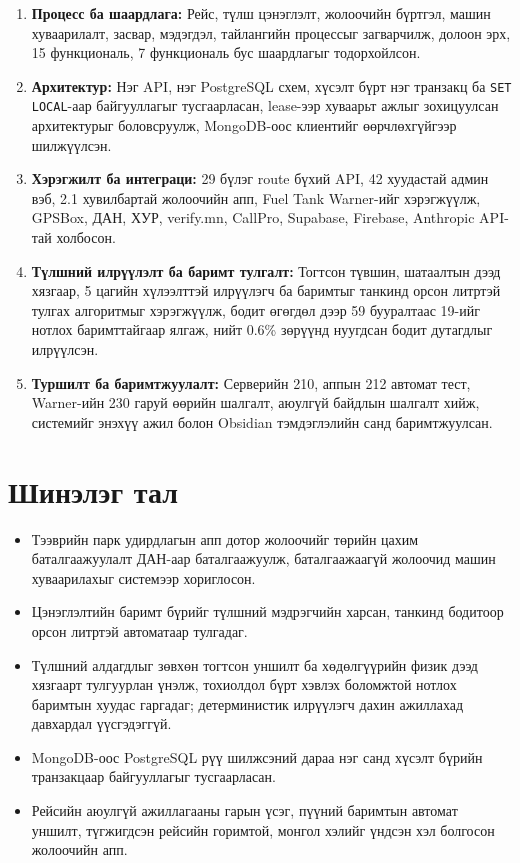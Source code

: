\documentclass[
12pt,
oneside,
english,
onehalfspacing,
nolistspacing,
headsepline,
]{MUST-Thesis}
\begin{document}
\begin{enumerate}
    \item \textbf{Процесс ба шаардлага:} Рейс, түлш цэнэглэлт, жолоочийн бүртгэл, машин хуваарилалт, засвар, мэдэгдэл, тайлангийн процессыг загварчилж, долоон эрх, 15 функциональ, 7 функциональ бус шаардлагыг тодорхойлсон.
    \item \textbf{Архитектур:} Нэг API, нэг PostgreSQL схем, хүсэлт бүрт нэг транзакц ба \texttt{SET LOCAL}-аар байгууллагыг тусгаарласан, lease-ээр хуваарьт ажлыг зохицуулсан архитектурыг боловсруулж, MongoDB-оос клиентийг өөрчлөхгүйгээр шилжүүлсэн.
    \item \textbf{Хэрэгжилт ба интеграци:} 29 бүлэг route бүхий API, 42 хуудастай админ вэб, 2.1 хувилбартай жолоочийн апп, Fuel Tank Warner-ийг хэрэгжүүлж, GPSBox, ДАН, ХУР, verify.mn, CallPro, Supabase, Firebase, Anthropic API-тай холбосон.
    \item \textbf{Түлшний илрүүлэлт ба баримт тулгалт:} Тогтсон түвшин, шатаалтын дээд хязгаар, 5 цагийн хүлээлттэй илрүүлэгч ба баримтыг танкинд орсон литртэй тулгах алгоритмыг хэрэгжүүлж, бодит өгөгдөл дээр 59 бууралтаас 19-ийг нотлох баримттайгаар ялгаж, нийт 0.6\% зөрүүнд нуугдсан бодит дутагдлыг илрүүлсэн.
    \item \textbf{Туршилт ба баримтжуулалт:} Серверийн 210, аппын 212 автомат тест, Warner-ийн 230 гаруй өөрийн шалгалт, аюулгүй байдлын шалгалт хийж, системийг энэхүү ажил болон Obsidian тэмдэглэлийн санд баримтжуулсан.
\end{enumerate}

\section{Шинэлэг тал}

\begin{itemize}
    \item Тээврийн парк удирдлагын апп дотор жолоочийг төрийн цахим баталгаажуулалт ДАН-аар баталгаажуулж, баталгаажаагүй жолоочид машин хуваарилахыг системээр хориглосон.
    \item Цэнэглэлтийн баримт бүрийг түлшний мэдрэгчийн харсан, танкинд бодитоор орсон литртэй автоматаар тулгадаг.
    \item Түлшний алдагдлыг зөвхөн тогтсон уншилт ба хөдөлгүүрийн физик дээд хязгаарт тулгуурлан үнэлж, тохиолдол бүрт хэвлэх боломжтой нотлох баримтын хуудас гаргадаг; детерминистик илрүүлэгч дахин ажиллахад давхардал үүсгэдэггүй.
    \item MongoDB-оос PostgreSQL рүү шилжсэний дараа нэг санд хүсэлт бүрийн транзакцаар байгууллагыг тусгаарласан.
    \item Рейсийн аюулгүй ажиллагааны гарын үсэг, пүүний баримтын автомат уншилт, түгжигдсэн рейсийн горимтой, монгол хэлийг үндсэн хэл болгосон жолоочийн апп.
\end{itemize}
\end{document}
